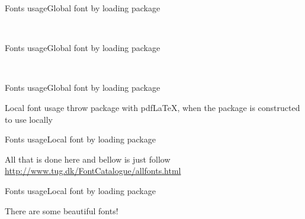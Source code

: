 \begin{frame}[t, fragile]{Fonts usage\magicPage}{Global font by loading package}\relax

\relax

\ncol\usepackage{<fontPackage>}\\
\Oncol\usepackage[T1]{fontenc}

     
\end{frame}

\begin{frame}[t, fragile]{Fonts usage\magicPage}{Global font by loading package}\relax

\relax

\ncol\usepackage{<fontPackage>}\\
\Oncol\usepackage[LY1]{fontenc}
\end{frame}

\begin{frame}[t, fragile]{Fonts usage\magicPage}{Global font by loading package}\relax

\relax

\end{frame}

\begin{frame}

\magicPage
     \centering\huge Local font usage throw package with pdf\LaTeX, when the package is constructed to use locally
\end{frame}

\begin{frame}[t, fragile]{Fonts usage\magicPage}{Local font by loading package}\relax

\relax

All that is done here and bellow is just follow \url{http://www.tug.dk/FontCatalogue/allfonts.html}

\end{frame}

\begin{frame}[t, fragile]{Fonts usage\magicPage}{Local font by loading package}\relax

\relax

There are some beautiful fonts!

\end{frame}

